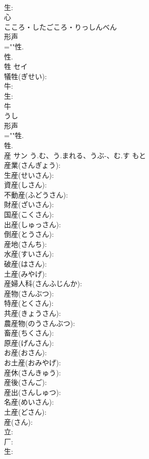 \documentclass[8pt]{extreport}
\begin{document}
\begin{CJK}{UTF8}{min}
\\	生: 
\\	心	
\\	こころ・したごころ・りっしんべん	
\\	形声 
\\	=""性.
\\	性.
\\	牲	セイ			
\\	犠牲(ぎせい): 
\\	牛: 
\\	生: 
\\	牛	
\\	うし	
\\	形声 
\\	=""牲.
\\	牲.
\\	産	サン	う.む、う.まれる、うぶ-、む.す	もと	
\\	産業(さんぎょう): 
\\	生産(せいさん): 
\\	資産(しさん): 
\\	不動産(ふどうさん): 
\\	財産(ざいさん): 
\\	国産(こくさん): 
\\	出産(しゅっさん): 
\\	倒産(とうさん): 
\\	産地(さんち): 
\\	水産(すいさん): 
\\	破産(はさん): 
\\	土産(みやげ): 
\\	産婦人科(さんふじんか): 
\\	産物(さんぶつ): 
\\	特産(とくさん): 
\\	共産(きょうさん): 
\\	農産物(のうさんぶつ): 
\\	畜産(ちくさん): 
\\	原産(げんさん): 
\\	お産(おさん): 
\\	お土産(おみやげ): 
\\	産休(さんきゅう): 
\\	産後(さんご): 
\\	産出(さんしゅつ): 
\\	名産(めいさん): 
\\	土産(どさん): 
\\	産(さん): 
\\	立: 
\\	厂: 
\\	生: 

\end{CJK}
\end{document}
